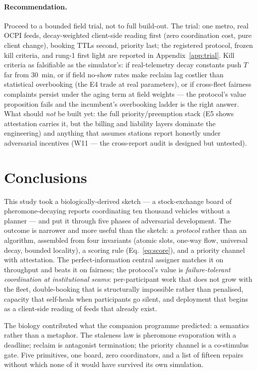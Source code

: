 \documentclass[twoside,twocolumn,usenatbib]{mnras}
\begin{document}
\paragraph{Recommendation.}  Proceed to a bounded field trial, not
to full build-out.  The trial: one metro, real OCPI feeds,
decay-weighted client-side reading first (zero coordination cost,
pure client change), booking TTLs second, priority last; the
registered protocol, frozen kill criteria, and rung-1 first light
are reported in Appendix~\ref{app:trial}.  Kill
criteria as falsifiable as the simulator's: if real-telemetry decay
constants push $T$ far from $30$~min, or if field no-show rates make
reclaim lag costlier than statistical overbooking (the E4 trade at
real parameters), or if cross-fleet fairness complaints persist
under the aging term at field weights --- the protocol's value
proposition fails and the incumbent's overbooking ladder is the
right answer.  What should \emph{not} be built yet: the full
priority/preemption stack (E5 shows attestation carries it, but the
billing and liability layers dominate the engineering) and anything
that assumes stations report honestly under adversarial incentives
(W11 --- the cross-report audit is designed but untested).

\section{Conclusions}

\label{sec:concl}

This study took a biologically-derived sketch --- a stock-exchange
board of pheromone-decaying reports coordinating ten thousand
vehicles without a planner --- and put it through five phases of
adversarial development.  The outcome is narrower and more useful
than the sketch: a \emph{protocol} rather than an algorithm,
assembled from four
invariants (atomic slots, one-way flow, universal decay, bounded
locality), a scoring rule (Eq.~\ref{eq:score}), and a priority
channel with attestation.  The
perfect-information central assigner matches it on throughput and
beats it on fairness; the protocol's value is \emph{failure-tolerant
coordination at
institutional seams}: per-participant work that does not grow with
the fleet, double-booking that is structurally impossible rather
than penalised, capacity that self-heals when participants go
silent, and deployment that begins as a client-side reading of
feeds that already exist.

The biology contributed what the companion
programme predicted: a semantics rather than a metaphor.  The
staleness law is pheromone evaporation with a deadline; reclaim is
antagonist termination; the priority channel is a co-stimulus gate.
Five primitives, one board, zero coordinators, and a list of
fifteen repairs without which none of it would have survived its
own simulation.
\end{document}
